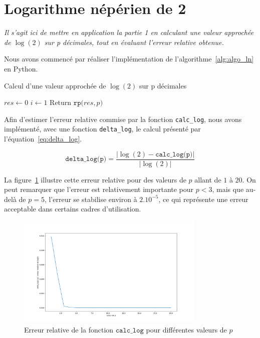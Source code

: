 \documentclass{article}
\begin{document}


\section{Logarithme népérien de 2}
\label{sec:ln}
\textit{Il s'agit ici de mettre en application la partie 1 en calculant une valeur approchée de $\log(2)$ sur p d\'ecimales, tout en \'evaluant l'erreur relative obtenue.}
\vskip 1mm ~

Nous avons commencé par réaliser l'implémentation de l'algorithme~\ref{alg:algo_ln} en Python.

\begin{algorithm}
  \caption{Calcul d'une valeur approchée de $\log(2)$ sur p d\'ecimales}
  \label{alg:algo_ln}
  $res \gets 0$\;
  $i \gets 1$\;
  Return $\texttt{rp(}res,p\texttt{)}$\;
\end{algorithm}




Afin d'estimer l'erreur relative commise par la fonction \verb|calc_log|, nous avons implémenté, avec une fonction \verb|delta_log|, le calcul présenté par l'équation~\ref{eq:delta_log}.

\begin{equation}
  \texttt{delta\_log(p)} = \dfrac{\big\vert \log(2) - \texttt{calc\_log(p)} \big\vert}{\big\vert \log(2) \big\vert}
  \label{eq:delta_log}
 \end{equation} 

La figure~\ref{fig:relative_error_log} illustre cette erreur relative pour des valeurs de $p$ allant de $1$ à $20$. On peut remarquer que l'erreur est relativement importante pour $p<3$, mais que au-delà de $p=5$, l'erreur se stabilise environ à $2.10^{-5}$, ce qui représente une erreur acceptable dans certains cadres d'utilisation.

\begin{figure}[ht]
 \centering
 \includegraphics[width=0.8\textwidth]{partie2_relative_error_log.png}
 \caption{Erreur relative de la fonction $\texttt{calc\_log}$ pour différentes valeurs de $p$}
 \label{fig:relative_error_log}        
\end{figure}
\end{document}
